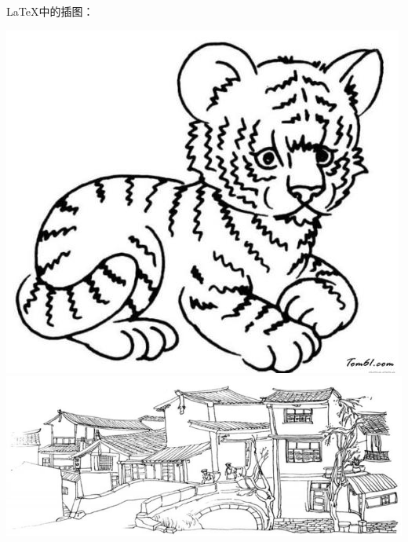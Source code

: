 \documentclass{ctexart}%
\begin{document}
	\LaTeX{}中的插图：
	
	\includegraphics{lion}
	\includegraphics{mountain}
	
\end{document}
